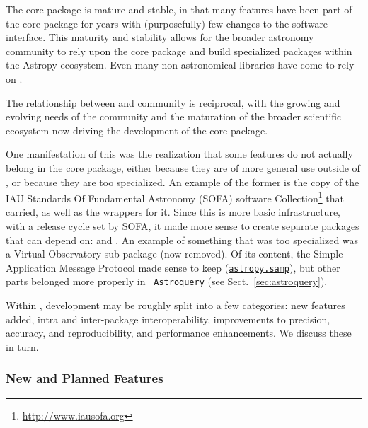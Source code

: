 \documentclass[modern]{aastex631}
\newcommand{\astropysubpkg}[1]{\href{http://docs.astropy.org/en/stable/#1/index.html}{\texttt{astropy.#1}}\xspace}
\begin{document}
The \astropypkg core package is mature and stable, in that many features have
been part of the core package for years with (purposefully) few changes to the
software interface. This maturity and stability allows for the broader
astronomy \python community to rely upon the \astropypkg core package and
build specialized packages within the Astropy ecosystem. Even many
non-astronomical \python libraries have come to rely on \astropypkg.

The relationship between \astropy and community is reciprocal, with the
growing and evolving needs of the community and the maturation of the broader
scientific \python ecosystem now driving the development of the \astropypkg
core package.

One manifestation of this was the realization that some features do not actually
belong in the core package, either because they are of more general use
outside of \astropypkg, or because they are too specialized. An example of the
former is the copy of the IAU Standards Of Fundamental Astronomy (SOFA)
software Collection\footnote{\url{http://www.iausofa.org}} \citep{sofa} that
\astropy carried, as well as the \python wrappers for it.  Since this is more
basic infrastructure, with a release cycle set by SOFA, it made more sense to
create separate packages that \astropypkg can depend on: 
\citep{erfa} and  \citep{pyerfa}. An example of something that
was too specialized was a Virtual Observatory sub-package (now removed).  Of
its content, the Simple Application Message Protocol made sense to keep
(\astropysubpkg{samp}), but other parts belonged more properly in {\tt
Astroquery} (see Sect.~\ref{sec:astroquery}).

Within \astropypkg, development may be roughly split into a few
categories: new features added, intra and inter-package
interoperability, improvements to precision, accuracy, and
reproducibility, and performance enhancements. We discuss these in turn.


\subsubsection*{New and Planned Features} \label{sec:core-features-new}

\end{document}
